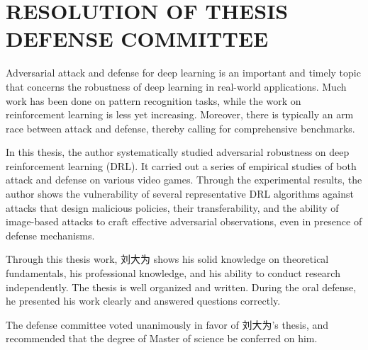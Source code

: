 
\chapter{RESOLUTION OF THESIS DEFENSE COMMITTEE}

Adversarial attack and defense for deep learning is an important and timely topic that concerns the robustness of deep learning in real-world applications. Much work has been done on pattern recognition tasks, while the work on reinforcement learning is less yet increasing. Moreover, there is typically an arm race between attack and defense, thereby calling for comprehensive benchmarks. 

In this thesis, the author systematically studied adversarial robustness on deep reinforcement learning (DRL). It carried out a series of empirical studies of both attack and defense on various video games. Through the experimental results, the author shows the vulnerability of several representative DRL algorithms against attacks that design malicious policies, their transferability, and the ability of image-based attacks to craft effective adversarial observations, even in presence of defense mechanisms.

Through this thesis work, 刘大为 shows his solid knowledge on theoretical fundamentals, his professional knowledge, and his ability to conduct research independently. The thesis is well organized and written. During the oral defense, he presented his work clearly and answered questions correctly.
 
The defense committee voted unanimously in favor of 刘大为’s thesis, and recommended that the degree of Master of science be conferred on him. 










